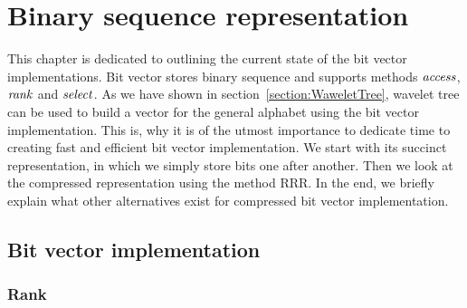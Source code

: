 \chapter{Binary sequence representation}
\label{kap:kap2}

This chapter is dedicated to outlining the current state of the bit vector
implementations. Bit vector stores binary sequence and supports methods $\mathit{access}$,
$\mathit{rank}$ and $\mathit{select}$. As we have shown in section~\ref{section:WaweletTree}, wavelet
tree can be used to build a vector for the general alphabet using the bit vector
implementation. This is, why it is of the utmost importance to dedicate time
to creating fast and efficient bit vector implementation. We start with its
succinct representation, in which we simply store bits one after another. Then we
look at the compressed representation using the method RRR. In the end, we briefly
explain what other alternatives exist for compressed bit vector implementation.

\section{Bit vector implementation}

\subsection{Rank}
\label{section:rank}

